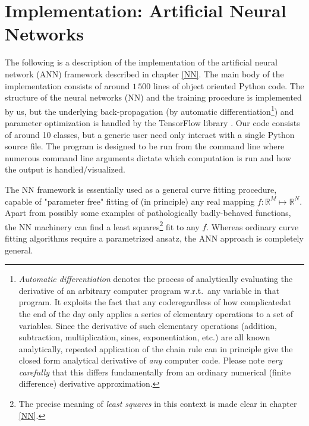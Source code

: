 \documentclass[../../master.tex]{subfiles}
\begin{document}
\chapter{Implementation: Artificial Neural Networks \label{NNimplementation}}
The following is a description of the implementation of the artificial neural network (ANN) framework described in chapter \ref{NN}. The main body of the implementation consists of around $1\,500$ lines of object oriented Python code. The structure of the neural networks (NN) and the training procedure is implemented by us, but the underlying back-propagation (by automatic differentiation\footnote{\emph{Automatic differentiation} denotes the process of analytically evaluating the derivative of an arbitrary computer program w.r.t.\ any variable in that program. It exploits the fact that any code\textemdash regardless of how complicated\textemdash at the end of the day only applies a series of elementary operations to a set of variables. Since the derivative of such elementary operations (addition, subtraction, multiplication, sines, exponentiation, etc.) are all known analytically, repeated application of the chain rule can in principle give the closed form analytical derivative of \emph{any} computer code. Please note \emph{very carefully} that this differs fundamentally from an ordinary numerical (finite difference) derivative approximation.}) and parameter optimization is handled by the TensorFlow library \cite{tensorflow}. Our code consists of around 10 classes, but a generic user need only interact with a single Python source file. The program is designed to be run from the command line where numerous command line arguments dictate which computation is run and how the output is handled/visualized.

The NN framework is essentially used as a general curve fitting procedure, capable of "parameter free" fitting of (in principle) any real mapping $f:\mathbb{R}^M\mapsto \mathbb{R}^N$. Apart from possibly some examples of pathologically badly-behaved functions, the NN machinery can find a least squares\footnote{The precise meaning of \emph{least squares} in this context is made clear in chapter \ref{NN}.} fit to any $f$. Whereas ordinary curve fitting algorithms require a parametrized ansatz, the ANN approach is completely general. 
\end{document}
